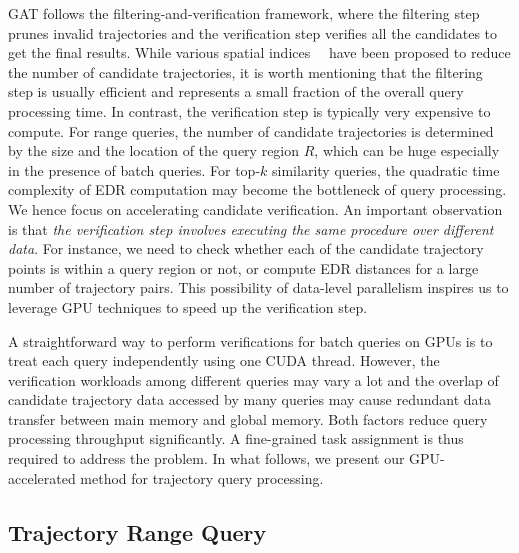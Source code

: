 \documentclass[10pt,conference,letterpaper]{IEEEtran}
\newcommand{\frname}{GAT\xspace }
\begin{document}
\frname follows the filtering-and-verification framework, where the filtering step prunes invalid trajectories and the verification step verifies all the candidates to get the final results.
While various spatial indices~\cite{DBLP:conf/icde/Cudre-MaurouxWM10}~\cite{DBLP:conf/cidr/ChakkaEP03} have been proposed to reduce the number of candidate trajectories, it is worth mentioning that the filtering step is usually efficient and represents a small fraction of the overall query processing time. In contrast, the verification step is typically very expensive to compute.
%
For range queries, the number of candidate trajectories is determined by the size and the location of the query region $R$, which can be huge especially in the presence of batch queries. For top-$k$ similarity queries, the quadratic time complexity of EDR computation may become the bottleneck of query processing. 
%
We hence focus on accelerating candidate verification. An important observation is that \emph{the verification step involves executing the same procedure over different data}. For instance,  we need to check whether each of the candidate trajectory points is within a query region or not, or compute EDR distances for a large number of trajectory pairs. This possibility of data-level parallelism inspires us to leverage GPU techniques to speed up the verification step.

A straightforward way to perform verifications for batch queries on GPUs is to treat each query independently using one CUDA thread.
However, the verification workloads among different queries may vary a lot and the overlap of candidate trajectory data accessed by many queries may cause redundant data transfer between main memory and global memory. Both factors reduce query processing throughput significantly.
A fine-grained task assignment is thus required to address the problem.
In what follows, we present our GPU-accelerated method for trajectory query processing.




\subsection{Trajectory Range Query}
\end{document}
